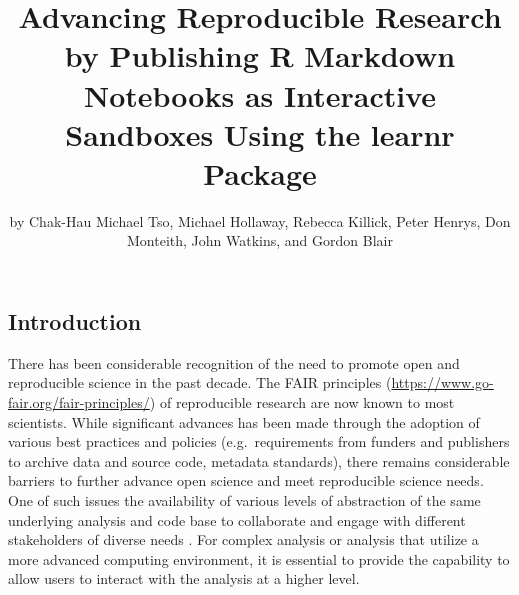 \title{Advancing Reproducible Research by Publishing R Markdown Notebooks as
Interactive Sandboxes Using the learnr Package}
\author{by Chak-Hau Michael Tso, Michael Hollaway, Rebecca Killick, Peter Henrys, Don Monteith, John Watkins, and Gordon Blair}

\maketitle


\hypertarget{introduction}{%
\subsection{Introduction}\label{introduction}}

There has been considerable recognition of the need to promote open and
reproducible science in the past decade. The FAIR principles
\citep{Wilkinson2016a, Stall2019}
(\url{https://www.go-fair.org/fair-principles/}) of reproducible research
are now known to most scientists. While significant advances has been
made through the adoption of various best practices and policies
(e.g.~requirements from funders and publishers to archive data and
source code, metadata standards), there remains considerable barriers to
further advance open science and meet reproducible science needs. One of
such issues the availability of various levels of abstraction of the
same underlying analysis and code base to collaborate and engage with
different stakeholders of diverse needs \citep{Blair2019, Hollaway2020}.
For complex analysis or analysis that utilize a more advanced computing
environment, it is essential to provide the capability to allow users to
interact with the analysis at a higher level.

